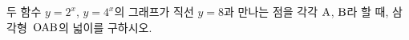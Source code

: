 두 함수 $y=2^x$, $y=4^x$의 그래프가 직선 $y=8$과 만나는 점을 각각 $\mathrm{A}$, $\mathrm{B}$라 할 때, 삼각형~$\mathrm{OAB}$의 넓이를 구하시오. 
